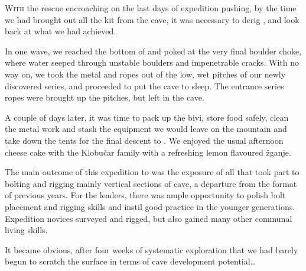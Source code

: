 \newpage
\thispagestyle{endchapter}
\begin{tcolorbox}
	\vspace{80pt}
	\lettrine{W}{ith} the rescue encroaching on the last days of expedition pushing, by the time we had  brought out all the kit from the cave, it was necessary to derig , and look back at what we had achieved.

 	In one wave, we reached the bottom of  and poked at the very final boulder choke, where water seeped through unstable boulders and impenetrable cracks. With no way on, we took the metal and ropes out of the low, wet pitches of our newly discovered series, and proceeded to put the cave to sleep. The entrance series ropes were brought up the pitches, but left in the cave.

	A couple of days later, it was time to pack up the bivi, store food safely, clean the metal work and stash the equipment we would leave on the mountain and take down the tents for the final descent to . We enjoyed the usual afternoon cheese cake with the Klobu\v{c}ar family with a refreshing lemon flavoured \v{z}ganje.

	The main outcome of this expedition to  was the exposure of all that took part to bolting and rigging mainly vertical sections of cave, a departure from the format of previous years. For the leaders, there was ample opportunity to polish bolt placement and rigging skills and instil good practice in the younger generations. Expedition novices surveyed and rigged, but also gained many other communal living skills.

	It became obvious, after four weeks of systematic exploration that we had barely begun to scratch the surface in terms of cave development potential…

\end{tcolorbox}

